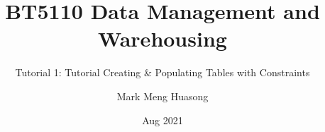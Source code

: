 \documentclass[xcolor=dvipsnames]{beamer}
\title{BT5110 Data Management and Warehousing}
\subtitle{Tutorial 1: Tutorial Creating \& Populating Tables with Constraints}
\author{Mark Meng Huasong}
\institute[National University of Singapore] %
{
  School of Computing\\
  National University of Singapore
}
\date{Aug 2021}
\begin{document}
\begin{frame}
  \titlepage
\end{frame}


\end{document}
